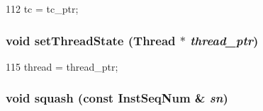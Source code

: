 \begin{DoxyCode}
112     { tc = tc_ptr; }
\end{DoxyCode}
\hypertarget{classLWBackEnd_a850bea4a9b9f631e7b6a4c7dc92f662a}{
\subsubsection[{setThreadState}]{\setlength{\rightskip}{0pt plus 5cm}void setThreadState ({\bf Thread} $\ast$ {\em thread\_\-ptr})}}
\label{classLWBackEnd_a850bea4a9b9f631e7b6a4c7dc92f662a}



\begin{DoxyCode}
115     { thread = thread_ptr; }
\end{DoxyCode}
\hypertarget{classLWBackEnd_adc9b67ce59b0b2e930cfaf6361ce42c5}{
\subsubsection[{squash}]{\setlength{\rightskip}{0pt plus 5cm}void squash (const {\bf InstSeqNum} \& {\em sn})}}
\label{classLWBackEnd_adc9b67ce59b0b2e930cfaf6361ce42c5}



